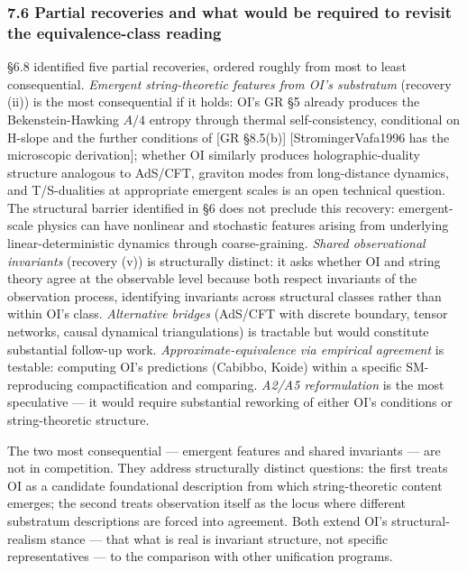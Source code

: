 \documentclass[
]{article}
\begin{document}
\hypertarget{partial-recoveries-and-what-would-be-required-to-revisit-the-equivalence-class-reading}{%
\subsubsection{7.6 Partial recoveries and what would be required to
revisit the equivalence-class
reading}\label{partial-recoveries-and-what-would-be-required-to-revisit-the-equivalence-class-reading}}

§6.8 identified five partial recoveries, ordered roughly from most to
least consequential. \emph{Emergent string-theoretic features from OI's
substratum} (recovery (ii)) is the most consequential if it holds: OI's
GR §5 already produces the Bekenstein-Hawking \(A/4\) entropy through
thermal self-consistency, conditional on H-slope and the further
conditions of {[}GR §8.5(b){]} {[}StromingerVafa1996 has the microscopic
derivation{]}; whether OI similarly produces holographic-duality
structure analogous to AdS/CFT, graviton modes from long-distance
dynamics, and T/S-dualities at appropriate emergent scales is an open
technical question. The structural barrier identified in §6 does not
preclude this recovery: emergent-scale physics can have nonlinear and
stochastic features arising from underlying linear-deterministic
dynamics through coarse-graining. \emph{Shared observational invariants}
(recovery (v)) is structurally distinct: it asks whether OI and string
theory agree at the observable level because both respect invariants of
the observation process, identifying invariants across structural
classes rather than within OI's class. \emph{Alternative bridges}
(AdS/CFT with discrete boundary, tensor networks, causal dynamical
triangulations) is tractable but would constitute substantial follow-up
work. \emph{Approximate-equivalence via empirical agreement} is
testable: computing OI's predictions (Cabibbo, Koide) within a specific
SM-reproducing compactification and comparing. \emph{A2/A5
reformulation} is the most speculative --- it would require substantial
reworking of either OI's conditions or string-theoretic structure.

The two most consequential --- emergent features and shared invariants
--- are not in competition. They address structurally distinct
questions: the first treats OI as a candidate foundational description
from which string-theoretic content emerges; the second treats
observation itself as the locus where different substratum descriptions
are forced into agreement. Both extend OI's structural-realism stance
--- that what is real is invariant structure, not specific
representatives --- to the comparison with other unification programs.
\end{document}
